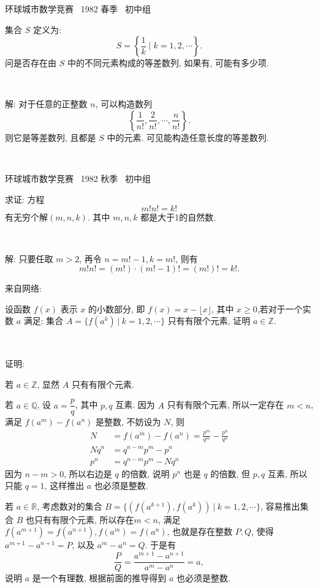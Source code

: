 \newpage

\noindent 环球城市数学竞赛~ 1982 春季~ 初中组

集合 $ S $ 定义为: \[ S = \left\{ \frac{1}{k} \mid k = 1, 2, \cdots \right\} .\] 问是否存在由 $ S $ 中的不同元素构成的等差数列, 如果有, 可能有多少项.

~

解: 对于任意的正整数 $ n $, 可以构造数列 \[ \left\{ \frac{1}{n!}, \frac{2}{n!}, \cdots, \frac{n}{n!} \right\}. \]
则它是等差数列, 且都是 $ S $ 中的元素. 可见能构造任意长度的等差数列.

~


\noindent 环球城市数学竞赛~ 1982 秋季~ 初中组

求证: 方程
\[m!n!=k!\]
有无穷个解$(m,n,k)$. 其中 $m,n,k$ 都是大于1的自然数.

~

解: 只要任取 $m>2$, 再令 $n = m!-1, k=m!$, 则有 
$$m!n!=(m!)\cdot(m!-1)!=(m!)!=k! .$$


\newpage

\noindent 来自网络:

设函数 $f(x)$ 表示 $x$ 的小数部分, 即 $f(x) = x - \lfloor x \rfloor$, 其中 $x\ge 0$,若对于一个实数 $a$ 满足: 集合 $A = \{ f(a^k)\ |\ k = 1,2,\cdots \}$ 只有有限个元素, 证明 $a\in \mathbb{Z}$.

~

\noindent 证明: 

若 $a\in \mathbb{Z}$, 显然 $A$ 只有有限个元素.

若 $a \in \mathbb{Q}$, 设 $a = \dfrac{p}{q}$, 其中 $p,q$ 互素. 因为 $A$ 只有有限个元素, 所以一定存在 $m < n$, 满足 $f(a^m) - f(a^n)$ 是整数, 不妨设为 $N$, 则
\begin{align*}
N &= f(a^m) - f(a^n) = \frac{p^m}{q^m} - \frac{p^n}{q^n}\\
Nq^n & = q^{n-m}p^m - p^n\\
p^n &= q^{n-m}p^m - Nq^n
\end{align*}
因为 $n-m > 0$, 所以右边是 $q$ 的倍数, 说明 $p^n$ 也是  $q$ 的倍数, 但 $p,q$ 互素, 所以只能 $q=1$, 这样推出 $a$ 也必须是整数. 

若 $a \in \mathbb{R}$, 考虑数对的集合 $B =  \{ (f(a^{k+1}),f(a^k))\ |\ k = 1,2,\cdots \}$, 容易推出集合 $B$ 也只有有限个元素, 所以存在$m < n$, 满足 $f(a^{m+1}) = f(a^{n+1}), f(a^m) = f(a^n)$, 也就是存在整数 $P,Q$, 使得 $a^{m+1} - a^{n+1} = P$, 以及 $a^m - a^n = Q$. 于是有
\[\frac{P}{Q} = \frac{a^{m+1} - a^{n+1}}{a^m - a^n} = a ,\]
说明 $a$ 是一个有理数, 根据前面的推导得到 $a$ 也必须是整数.


